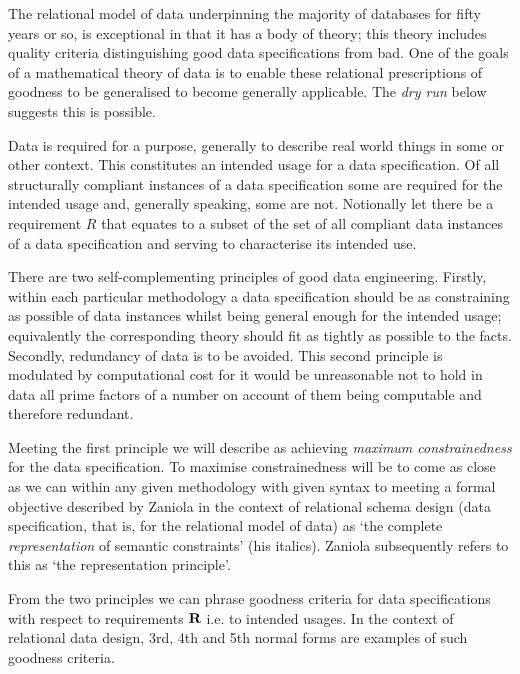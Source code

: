 \documentclass[10pt,a4paper]{article}
\theoremstyle{remark}
\renewcommand{\term}[1]{\textit{#1}}  %
\begin{document}
\note 
The relational model of data underpinning the majority of databases for fifty years or so, is exceptional in that it has a body of theory; this theory includes quality criteria  distinguishing good data specifications from bad. 
One of the goals of a mathematical theory of data is to enable these relational prescriptions of goodness
to be generalised to become generally applicable. The \textit{dry run} below suggests this is possible.

\note
Data is required for a purpose, generally to describe real world things in some or other context. This constitutes an intended usage for a data specification. Of all structurally compliant instances of a data specification some are required for the intended usage and, generally speaking, some are not.
Notionally let there be a requirement $R$ that equates to a subset of the set of all compliant data instances 
of a data specification and serving to characterise its intended use. 

\note 
There are two self-complementing principles of good data engineering. Firstly, within each particular methodology a data specification should be as constraining as possible of data instances whilst being general enough for the intended usage; equivalently the corresponding theory should fit as tightly as possible to the facts. Secondly, redundancy of data is to be avoided. This second principle is modulated by computational cost for it would be unreasonable not to hold in data all prime factors of a number on account of them being computable and therefore redundant.

\note 
Meeting the first principle we will describe as achieving \term{maximum constrainedness} for the data specification.
To maximise constrainedness will be to come as  close as we can within any given methodology with given syntax to meeting a formal objective described by Zaniola \cite{zaniolo1982} in the context of relational schema design (data specification, that is, for the relational model of data)  as `the complete \textit{representation} of semantic constraints' (his italics). Zaniola subsequently refers to this as `the representation principle'.

\note
From the two principles we can phrase goodness criteria  for data specifications with respect to requirements $\textbf{R}$
i.e. to intended usages. In the context of relational data design, 3rd, 4th and 5th normal forms are examples of such goodness criteria. 
\end{document}
